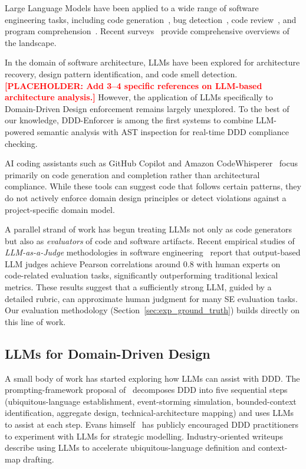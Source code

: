 \documentclass[smallextended]{svjour3}
\newcommand{\placeholder}[1]{\textcolor{red}{\textbf{[PLACEHOLDER: #1]}}}
\begin{document}
Large Language Models have been applied to a wide range of software engineering tasks, including code generation~\cite{chen2021codex}, bug detection~\cite{li2024llm_bugs}, code review~\cite{li2022codereviewer}, and program comprehension~\cite{nam2024llm_comprehension}.
Recent surveys~\cite{hou2024llm_se_survey, fan2023llm_se} provide comprehensive overviews of the landscape.

In the domain of software architecture, LLMs have been explored for architecture recovery, design pattern identification, and code smell detection.
\placeholder{Add 3--4 specific references on LLM-based architecture analysis.}
However, the application of LLMs specifically to Domain-Driven Design enforcement remains largely unexplored.
To the best of our knowledge, DDD-Enforcer is among the first systems to combine LLM-powered semantic analysis with AST inspection for real-time DDD compliance checking.

AI coding assistants such as GitHub Copilot and Amazon CodeWhisperer~\cite{yeticstiren2023copilot} focus primarily on code generation and completion rather than architectural compliance.
While these tools can suggest code that follows certain patterns, they do not actively enforce domain design principles or detect violations against a project-specific domain model.

A parallel strand of work has begun treating LLMs not only as code generators but also as \emph{evaluators} of code and software artifacts.
Recent empirical studies of \emph{LLM-as-a-Judge} methodologies in software engineering~\cite{llmjudgeSE2025,llmjudgeSurvey2024,llmjudgesComprehensive2024} report that output-based LLM judges achieve Pearson correlations around 0.8 with human experts on code-related evaluation tasks, significantly outperforming traditional lexical metrics.
These results suggest that a sufficiently strong LLM, guided by a detailed rubric, can approximate human judgment for many SE evaluation tasks.
Our evaluation methodology (Section~\ref{sec:exp_ground_truth}) builds directly on this line of work.

\subsection{LLMs for Domain-Driven Design}
\label{sec:bg_llm_ddd}

A small body of work has started exploring how LLMs can assist with DDD.
The prompting-framework proposal of~\cite{automatingddd2024} decomposes DDD into five sequential steps (ubiquitous-language establishment, event-storming simulation, bounded-context identification, aggregate design, technical-architecture mapping) and uses LLMs to assist at each step.
Evans himself~\cite{evans2024infoq} has publicly encouraged DDD practitioners to experiment with LLMs for strategic modelling.
Industry-oriented writeups~\cite{dddllmindustry2024} describe using LLMs to accelerate ubiquitous-language definition and context-map drafting.
\end{document}
